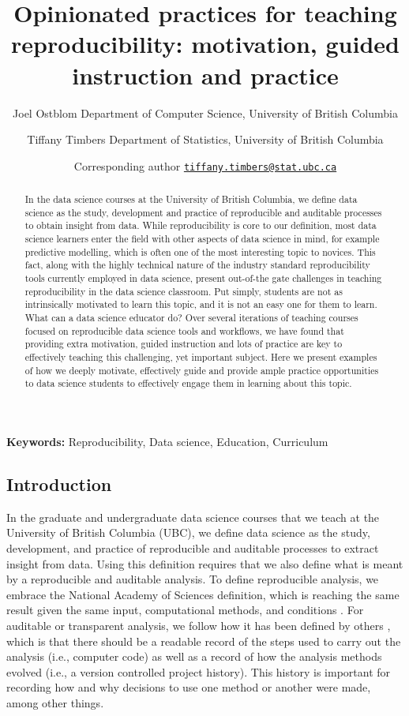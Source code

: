 \documentclass[
  12 pt,
]{paper}
\title{Opinionated practices for teaching reproducibility: motivation, guided instruction and practice}
\author{Joel Ostblom \small Department of Computer Science, University of British Columbia \and Tiffany Timbers \small Department of Statistics, University of British Columbia \and \footnotesize Corresponding author \href{mailto:tiffany.timbers@stat.ubc.ca}{\nolinkurl{tiffany.timbers@stat.ubc.ca}}}
\date{}
\begin{document}
\maketitle
\begin{abstract}
In the data science courses at the University of British Columbia,
we define data science as the study, development
and practice of reproducible
and auditable processes to obtain insight from data.
While reproducibility is core to our definition,
most data science learners enter the field with other aspects of data science in mind,
for example predictive modelling, which is often one of the most interesting topic to novices.
This fact, along with the highly technical nature
of the industry standard reproducibility tools currently employed in data science,
present out-of-the gate challenges in teaching reproducibility in the data science classroom.
Put simply, students are not as intrinsically motivated to learn this topic,
and it is not an easy one for them to learn. What can a data science educator do?
Over several iterations of teaching courses focused on reproducible data science tools and workflows,
we have found that providing extra motivation, guided instruction
and lots of practice are key to effectively teaching this challenging, yet important subject.
Here we present examples of how we deeply motivate, effectively guide
and provide ample practice opportunities to data science students
to effectively engage them in learning about this topic.
\end{abstract}

\textbf{Keywords:} Reproducibility, Data science, Education, Curriculum

\newpage

\hypertarget{introduction}{%
\subsection{Introduction}\label{introduction}}

In the graduate and undergraduate data science courses that we teach
at the University of British Columbia (UBC),
we define data science as the study, development, and practice of
reproducible and auditable processes to extract insight from data.
Using this definition requires that we also define
what is meant by a reproducible and auditable analysis.
To define reproducible analysis,
we embrace the National Academy of Sciences definition,
which is reaching the same result given the same input, computational methods,
and conditions \autocite*{national2019reproducibility}.
For auditable or transparent analysis,
we follow how it has been defined by others \autocite{parker2017opinionated,ram2013git},
which is that there should be a readable record of the steps used to carry out the analysis
(i.e., computer code)
as well as a record of how the analysis methods evolved
(i.e., a version controlled project history).
This history is important for recording how and why
decisions to use one method or another were made,
among other things.
\end{document}
